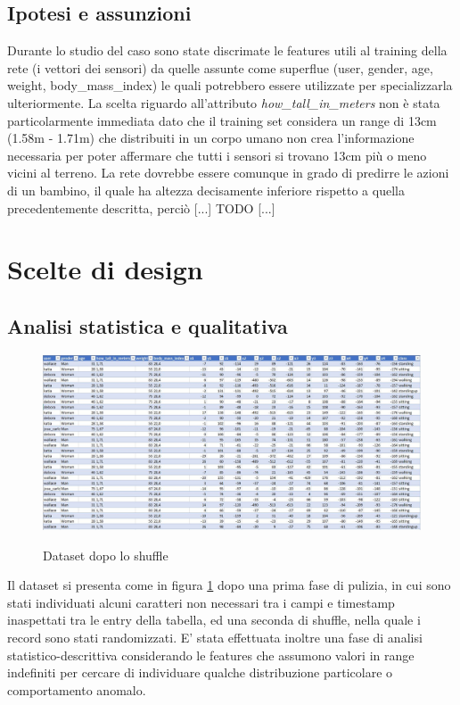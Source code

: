 \documentclass[12pt]{article}
\begin{document}
\subsection{Ipotesi e assunzioni}
Durante lo studio del caso sono state discrimate le features utili al training della rete (i vettori dei sensori) da quelle assunte come superflue (user, gender, age, weight, body\_mass\_index) le quali potrebbero essere utilizzate per specializzarla ulteriormente.\newline
La scelta riguardo all'attributo \emph{how\_tall\_in\_meters} non è stata particolarmente immediata dato che il training set considera un range di 13cm (1.58m - 1.71m) che distribuiti in un corpo umano non crea l'informazione necessaria per poter affermare che tutti i sensori si trovano 13cm più o meno vicini al terreno. La rete dovrebbe essere comunque in grado di predirre le azioni di un bambino, il quale ha altezza decisamente inferiore rispetto a quella precedentemente descritta, perciò [...] TODO [...] 

\section{Scelte di design}
\subsection{Analisi statistica e qualitativa}
\begin{figure}[H]
	\centering
	{\includegraphics[width=1\textwidth]{images/dataset.JPG}}
	\caption{Dataset dopo lo shuffle}
	\label{fig:dataset}
\end{figure}
Il dataset si presenta come in figura \ref{fig:dataset} dopo una prima fase di pulizia, in cui sono stati individuati alcuni caratteri non necessari tra i campi e timestamp inaspettati tra le entry della tabella, ed una seconda di shuffle, nella quale i record sono stati randomizzati. \newline
E' stata effettuata inoltre una fase di analisi statistico-descrittiva considerando le features che assumono valori in range indefiniti per cercare di individuare qualche distribuzione particolare o comportamento anomalo.
\end{document}
